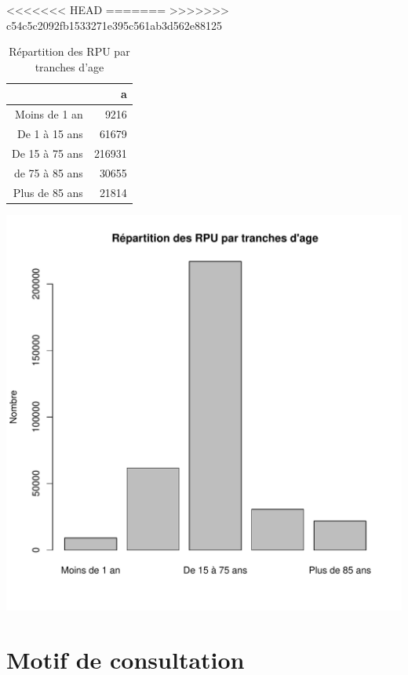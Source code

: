 \documentclass[12pt,english,french,twoside]{book}\usepackage[]{graphicx}\usepackage[]{color}
\makeatletter
\def\maxwidth{ %
  \ifdim\Gin@nat@width>\linewidth
    \linewidth
  \else
    \Gin@nat@width
  \fi
}
\makeatother
\begin{document}

<<<<<<< HEAD
=======
>>>>>>> c54c5c2092fb1533271e395c561ab3d562e88125
\begin{table}[ht]
\centering
\begin{tabular}{rr}
  \hline
 & a \\ 
  \hline
Moins de 1 an & 9216 \\ 
  De 1 à 15 ans & 61679 \\ 
  De 15 à 75 ans & 216931 \\ 
  de 75 à 85 ans & 30655 \\ 
  Plus de 85 ans & 21814 \\ 
   \hline
\end{tabular}
\caption[Répartition des RPU par tranches d'age]{Répartition des RPU par tranches d'age} 
\label{tab:tranche}
\end{table}

\includegraphics[width=\maxwidth]{figure/tranche} 




\newpage
\chapter{Motif de consultation}
\end{document}
